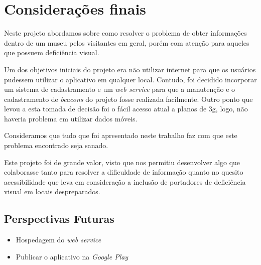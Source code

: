 \chapter*{Considerações finais}
\label{concl}

Neste projeto abordamos sobre como resolver o problema de obter informações dentro de um museu pelos visitantes em geral, porém com atenção para aqueles que possuem deficiência visual.

Um dos objetivos iniciais do projeto era não utilizar internet para que os usuários pudessem utilizar o aplicativo em qualquer local. Contudo, foi decidido incorporar um sistema de cadastramento e um \textit{web service} para que a manutenção e o cadastramento de \textit{beacons} do projeto fosse realizada facilmente. Outro ponto que levou a esta tomada de decisão foi o fácil acesso atual a planos de 3g, logo, não haveria problema em utilizar dados móveis.

Consideramos que tudo que foi apresentado neste trabalho faz com que este problema encontrado seja sanado.

Este projeto foi de grande valor, visto que nos permitiu desenvolver algo que colaborasse tanto para resolver a dificuldade de informação quanto no quesito acessibilidade que leva em consideração a inclusão de portadores de deficiência visual em locais despreparados.

\section*{Perspectivas Futuras}

\begin{itemize}
    \item Hospedagem do \textit{web service}
    \item Publicar o aplicativo na \textit{Google Play}
\end{itemize}